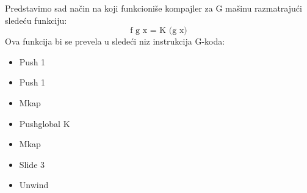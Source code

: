 \begin{primer}
	Predstavimo sad način na koji funkcioniše kompajler za G mašinu razmatrajući sledeću funkciju:
	$$\text{f g x = K (g x)}$$
	Ova funkcija bi se prevela u sledeći niz instrukcija G-koda:
	\begin{itemize}
	\item Push 1
	\item Push 1
	\item Mkap
	\item Pushglobal K
	\item Mkap
	\item Slide 3
	\item Unwind
	\end{itemize}
\end{primer}

